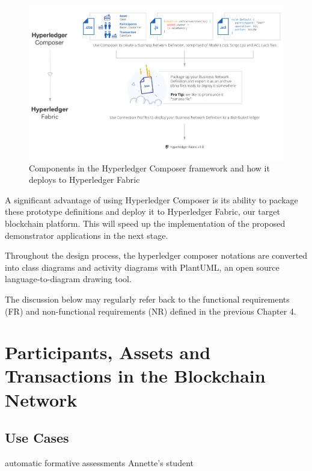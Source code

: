 \begin{figure}[!h] 
    \centering    
    \includegraphics[width=1.0\textwidth]{composer2fabric}
    \caption[Hyperledger Composer]
        {Components in the Hyperledger Composer framework and how it deploys to 
        Hyperledger Fabric \citep{cuicapuza2017composer}}
    \label{fig:composer2fabric}
\end{figure}

A significant advantage of using Hyperledger Composer is its ability to package these 
prototype definitions and deploy it to Hyperledger Fabric, our target blockchain platform. 
This will speed up the implementation of the proposed demonstrator applications 
in the next stage.

Throughout the design process, the hyperledger composer notations are converted into class 
diagrams and activity diagrams with PlantUML, an open source language-to-diagram drawing tool.

The discussion below may regularly refer back to the functional requirements (FR) and 
non-functional requirements (NR) defined in the previous Chapter 4.

\section{Participants, Assets and Transactions in the Blockchain Network}

\subsection{Use Cases}

automatic formative assessments Annette's student

